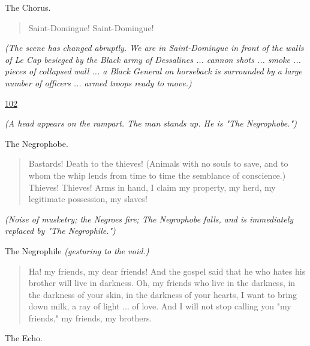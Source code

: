 \documentclass[letterpaper,article,12pt,oneside,notitlepage]{memoir}
\begin{document}
\begin{center}The Chorus.\end{center}

\begin{verse}
Saint-Domingue! Saint-Domingue! \\
\end{verse}

\textit{(The scene has changed abruptly. We are in Saint-Domingue in front of the walls of Le Cap besieged by the Black army of Dessalines ... cannon shots ... smoke ... pieces of collapsed wall ... a Black General on horseback is surrounded by a large number of officers ... armed troops ready to move.)}

\clearpage

\href{http://cesaire.elotroalex.com/chiens/chiens/p102.html}{102}

\textit{(A head appears on the rampart. The man stands up. He is "The Negrophobe.")}

\begin{center}The Negrophobe.\end{center}

\begin{verse}
Bastards! Death to the thieves! (Animals with no souls to save, and to whom the whip lends from time to time the semblance of conscience.) Thieves! Thieves! Arms in hand, I claim my property, my herd, my legitimate possession, my slaves!  \\
\end{verse}

\textit{(Noise of musketry; the Negroes fire; The Negrophobe falls, and is immediately replaced by "The Negrophile.")}

\begin{center}The Negrophile \textit{(gesturing to the void.)}\end{center}

\begin{verse}
Ha! my friends, my dear friends! And the gospel said that he who hates his brother will live in darkness. Oh, my friends who live in the darkness, in the darkness of your skin, in the darkness of your hearts, I want to bring down milk, a ray of light ... of love. And I will not stop calling you "my friends," my friends, my brothers.  \\
\end{verse}

\begin{center}The Echo.\end{center}
\end{document}
